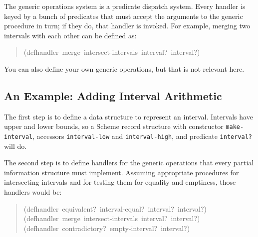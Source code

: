 \documentclass[12pt,letterpaper,english]{article}
\begin{document}
The generic operations system is a predicate dispatch system.  Every
handler is keyed by a bunch of predicates that must accept the
arguments to the generic procedure in turn; if they do, that handler
is invoked.  For example, merging two intervals with each other
can be defined as:
\begin{quote}{\ttfamily \raggedright \noindent
(defhandler~merge~intersect-intervals~interval?~interval?)
}\end{quote}

You can also define your own generic operations, but that is not
relevant here.



\hypertarget{an-example-adding-interval-arithmetic}{}
\subsection{An Example: Adding Interval Arithmetic}
\label{an-example-adding-interval-arithmetic}

The first step is to define a data structure to represent an interval.
Intervals have upper and lower bounds, so a Scheme record structure
with constructor \texttt{make-interval}, accessors \texttt{interval-low} and
\texttt{interval-high}, and predicate \texttt{interval?} will do.

The second step is to define handlers for the generic operations that
every partial information structure must implement.  Assuming
appropriate procedures for intersecting intervals and for testing them
for equality and emptiness, those handlers would be:
\begin{quote}{\ttfamily \raggedright \noindent
(defhandler~equivalent?~interval-equal?~interval?~interval?)~\\
(defhandler~merge~intersect-intervals~interval?~interval?)~\\
(defhandler~contradictory?~empty-interval?~interval?)
}\end{quote}
\end{document}
